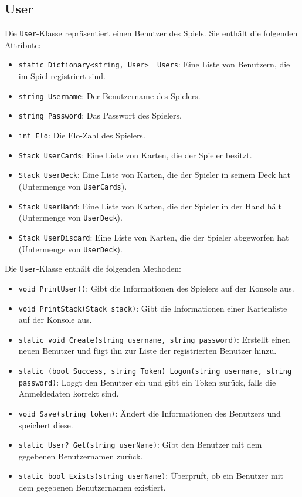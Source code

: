 \documentclass[a4paper, 12pt]{article}
\begin{document}
\subsection{User}
Die \texttt{User}-Klasse repräsentiert einen Benutzer des Spiels. Sie enthält die folgenden Attribute:
\begin{itemize}
    \item \texttt{static Dictionary<string, User> \_Users}: Eine Liste von Benutzern, die im Spiel registriert sind.
    \item \texttt{string Username}: Der Benutzername des Spielers.
    \item \texttt{string Password}: Das Passwort des Spielers.
    \item \texttt{int Elo}: Die Elo-Zahl des Spielers.
    \item \texttt{Stack UserCards}: Eine Liste von Karten, die der Spieler besitzt.
    \item \texttt{Stack UserDeck}: Eine Liste von Karten, die der Spieler in seinem Deck hat (Untermenge von \texttt{UserCards}).
    \item \texttt{Stack UserHand}: Eine Liste von Karten, die der Spieler in der Hand hält (Untermenge von \texttt{UserDeck}).
    \item \texttt{Stack UserDiscard}: Eine Liste von Karten, die der Spieler abgeworfen hat (Untermenge von \texttt{UserDeck}).
\end{itemize}

Die \texttt{User}-Klasse enthält die folgenden Methoden:
\begin{itemize}
    \item \texttt{void PrintUser()}: Gibt die Informationen des Spielers auf der Konsole aus.
    \item \texttt{void PrintStack(Stack stack)}: Gibt die Informationen einer Kartenliste auf der Konsole aus.
    \item \texttt{static void Create(string username, string password)}: Erstellt einen neuen Benutzer und fügt ihn zur Liste der registrierten Benutzer hinzu.
    \item \texttt{static (bool Success, string Token) Logon(string username, string password)}: Loggt den Benutzer ein und gibt ein Token zurück, falls die Anmeldedaten korrekt sind.
    \item \texttt{void Save(string token)}: Ändert die Informationen des Benutzers und speichert diese.
    \item \texttt{static User? Get(string userName)}: Gibt den Benutzer mit dem gegebenen Benutzernamen zurück.
    \item \texttt{static bool Exists(string userName)}: Überprüft, ob ein Benutzer mit dem gegebenen Benutzernamen existiert.
\end{itemize}
\end{document}
